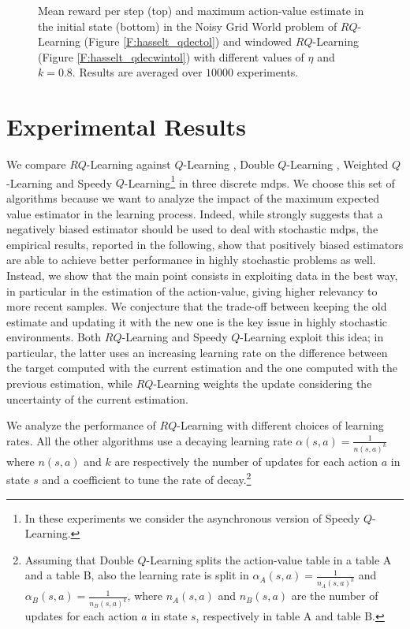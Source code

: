 \begin{figure}[t]
\begin{minipage}{\columnwidth}
\end{minipage}
  \caption[Noisy Grid World $RQ$-Learning variants comparison - 2]{Mean reward per step (top) and maximum action-value estimate in the initial state (bottom) in the Noisy Grid World problem of $RQ$-Learning (Figure \ref{F:hasselt_qdectol}) and windowed $RQ$-Learning (Figure \ref{F:hasselt_qdecwintol}) with different values of $\eta$ and $k = 0.8$. Results are averaged over $10000$ experiments.}
  \label{F:hasselt_QDecTol}
\end{figure}

\section{Experimental Results}\label{S:empirical}
We compare $RQ$-Learning against $Q$-Learning \cite{watkins1989learning}, Double $Q$-Learning \cite{van2010double}, Weighted $Q$-Learning \cite{deramo2016estimating} and Speedy $Q$-Learning\footnote{In these experiments we consider the asynchronous version of Speedy $Q$-Learning.} \cite{NIPS2011_4251} in three discrete \glspl{mdp}. We choose this set of algorithms because we want to analyze the impact of the maximum expected value estimator in the learning process. Indeed, while \cite{van2010double} strongly suggests that a negatively biased estimator should be used to deal with stochastic \glspl{mdp}, the  empirical results, reported in the following, show that positively biased estimators are able to achieve better performance in highly stochastic problems as well. Instead, we show that the main point consists in exploiting data in the best way, in particular in the estimation of the action-value, giving higher relevancy to more recent samples. We conjecture that the trade-off between keeping the old estimate and updating it with the new one is the key issue in highly stochastic environments. Both $RQ$-Learning and Speedy $Q$-Learning exploit this idea; in particular, the latter uses an increasing learning rate on the difference between the target computed with the current estimation and the one computed with the previous estimation, while $RQ$-Learning weights the update considering the uncertainty of the current estimation.

We analyze the performance of $RQ$-Learning with different choices of learning rates. All the other algorithms use a decaying learning rate $\alpha(s, a) = \frac{1}{n(s, a)^{k}}$ where $n(s, a)$ and $k$ are respectively the number of updates for each action $a$ in state $s$ and a coefficient to tune the rate of decay.\footnote{Assuming that Double $Q$-Learning splits the action-value table in a table A and a table B, also the learning rate is split in $\alpha_A(s, a) = \frac{1}{n_A(s, a)^{k}}$ and $\alpha_B(s, a) = \frac{1}{n_B(s, a)^{k}}$, where $n_A(s, a)$ and $n_B(s, a)$ are the number of updates for each action $a$ in state $s$, respectively in table A and table B.}

